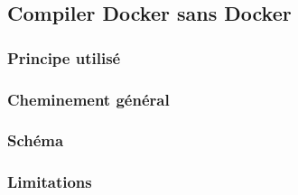 \documentclass[11pt,a4paper]{article}
\begin{document}
\subsection{Compiler Docker sans Docker}

\subsubsection{Principe utilisé}

\subsubsection{Cheminement général}

\subsubsection{Schéma}

\subsubsection{Limitations}
\end{document}
